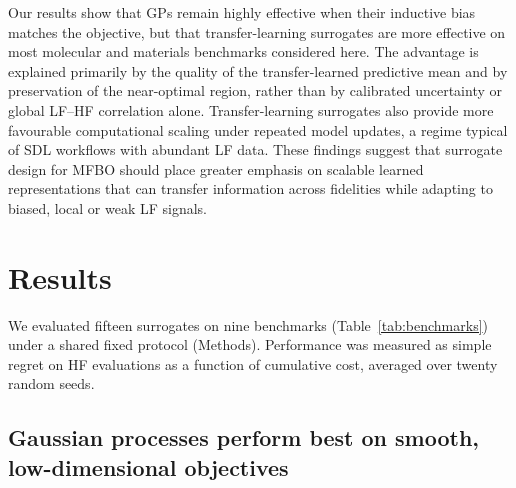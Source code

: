 \documentclass[11pt,a4paper]{article}%
\begin{document}
Our results show that GPs remain highly effective when their inductive bias matches the objective, but that transfer-learning surrogates are more effective on most molecular and materials benchmarks considered here. The advantage is explained primarily by the quality of the transfer-learned predictive mean and by preservation of the near-optimal region, rather than by calibrated uncertainty or global LF--HF correlation alone. Transfer-learning surrogates also provide more favourable computational scaling under repeated model updates, a regime typical of SDL workflows with abundant LF data. These findings suggest that surrogate design for MFBO should place greater emphasis on scalable learned representations that can transfer information across fidelities while adapting to biased, local or weak LF signals.



\section{Results}\label{sec:results}

We evaluated fifteen surrogates on nine benchmarks
(Table~\ref{tab:benchmarks}) under a shared fixed protocol (Methods). Performance was measured as simple regret on HF
evaluations as a function of cumulative cost, averaged over twenty random seeds.

\subsection{Gaussian processes perform best on smooth, low-dimensional
objectives}\label{sec:res-branin}
\end{document}
